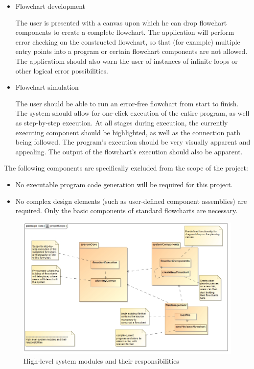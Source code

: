 \documentclass[12pt,a4paper,titlepage]{article}
\begin{document}
\begin{itemize}
\item Flowchart development

The user is presented with a canvas upon which he can drop flowchart components to create a  complete flowchart.
The application will perform error checking on the constructed flowchart, so that (for example) multiple entry points into a program or certain flowchart components are not allowed. The applicatiom should also warn the user of instances of infinite loops or other  logical error possibilities. 

\item Flowchart simulation

The user should be able to run an error-free flowchart from start to finish. The system should allow for one-click execution of the entire program, as well as step-by-step execution. At all stages during execution, the currently executing component should be
highlighted, as well as the connection path being followed. The program's execution should
be very visually apparent and appealing. The output of the flowchart's execution should also
be apparent. 
\end{itemize}

The following components are specifically excluded from the scope of the project:

\begin{itemize}
\item No executable program code generation will be required for this project.
\item No complex design elements (such as user-defined component assemblies) are required.
Only the basic components of standard flowcharts are necessary.\\

\end{itemize}

\begin{figure}[H]
  \centering
\includegraphics[width=500px]{projectScope.jpg}
\caption{High-level system modules and their responsibilities}
\end{figure}
\end{document}
